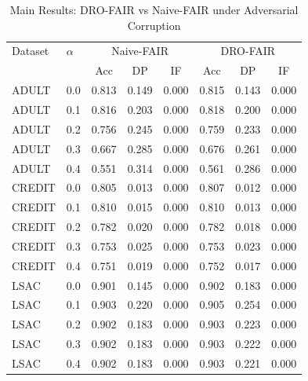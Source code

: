 \begin{table}[htbp]
\centering
\caption{Main Results: DRO-FAIR vs Naive-FAIR under Adversarial Corruption}
\begin{tabular}{ll|ccc|ccc}
\hline
\hline
Dataset & $\alpha$ & \multicolumn{3}{c|}{Naive-FAIR} & \multicolumn{3}{c}{DRO-FAIR} \\
& & Acc & DP & IF & Acc & DP & IF \\
\hline
ADULT & 0.0 & 0.813 & 0.149 & 0.000 & 0.815 & 0.143 & 0.000 \\
ADULT & 0.1 & 0.816 & 0.203 & 0.000 & 0.818 & 0.200 & 0.000 \\
ADULT & 0.2 & 0.756 & 0.245 & 0.000 & 0.759 & 0.233 & 0.000 \\
ADULT & 0.3 & 0.667 & 0.285 & 0.000 & 0.676 & 0.261 & 0.000 \\
ADULT & 0.4 & 0.551 & 0.314 & 0.000 & 0.561 & 0.286 & 0.000 \\
CREDIT & 0.0 & 0.805 & 0.013 & 0.000 & 0.807 & 0.012 & 0.000 \\
CREDIT & 0.1 & 0.810 & 0.015 & 0.000 & 0.810 & 0.013 & 0.000 \\
CREDIT & 0.2 & 0.782 & 0.020 & 0.000 & 0.782 & 0.018 & 0.000 \\
CREDIT & 0.3 & 0.753 & 0.025 & 0.000 & 0.753 & 0.023 & 0.000 \\
CREDIT & 0.4 & 0.751 & 0.019 & 0.000 & 0.752 & 0.017 & 0.000 \\
LSAC & 0.0 & 0.901 & 0.145 & 0.000 & 0.902 & 0.183 & 0.000 \\
LSAC & 0.1 & 0.903 & 0.220 & 0.000 & 0.905 & 0.254 & 0.000 \\
LSAC & 0.2 & 0.902 & 0.183 & 0.000 & 0.903 & 0.223 & 0.000 \\
LSAC & 0.3 & 0.902 & 0.183 & 0.000 & 0.903 & 0.222 & 0.000 \\
LSAC & 0.4 & 0.902 & 0.183 & 0.000 & 0.903 & 0.221 & 0.000 \\
\hline
\end{tabular}
\label{tab:main_results}
\end{table}